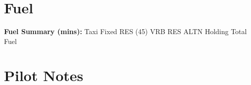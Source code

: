 \documentclass[a5paper,10pt]{article}
\begin{document}
\navcommlogtable

\section*{Fuel}

\noindent
\begin{minipage}[t]{7.3cm}
\end{minipage}
\hfill
\begin{minipage}[t]{7.3cm}
\end{minipage}

\vspace{0.5cm}
\noindent \textbf{Fuel Summary (mins):} Taxi \hspace{1.5cm} Fixed RES (45) \hspace{1.5cm} VRB RES \hspace{1.5cm} ALTN \hspace{1.5cm} Holding \hspace{1.5cm} Total Fuel

\vspace{0.5cm}
\section*{Pilot Notes}
\vspace{3cm}

\end{document}
